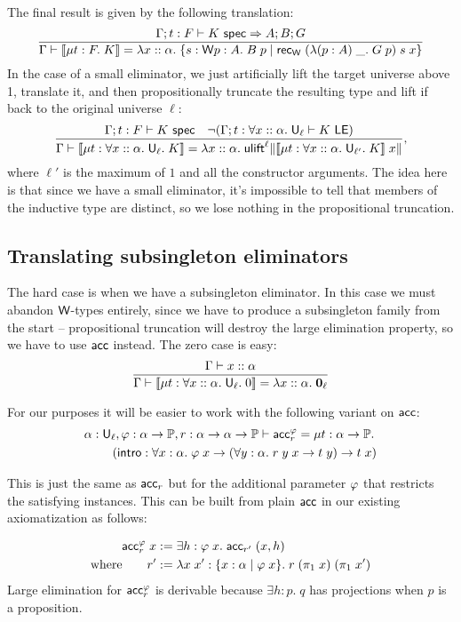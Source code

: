 The final result is given by the following translation:
$$\frac{\Gamma;t:F\vdash K\spec\Rightarrow A;B;G}
{\Gamma\vdash\scott{\mu t:F.\;K}=\lambda x::\alpha.\;\{s:\W p:A.\;B\;p\mid \rec_\W\;(\lambda (p:A)\; \_.\;G\;p)\;s\;x\}}$$
In the case of a small eliminator, we just artificially lift the target universe above 1, translate it, and then propositionally truncate the resulting type and lift if back to the original universe $\ell$:
$$\frac{\Gamma;t:F\vdash K\spec\quad \neg(\Gamma;t:\forall x::\alpha.\;\U_\ell\vdash K\LE)}
{\Gamma\vdash\scott{\mu t:\forall x::\alpha.\;\U_\ell.\;K}=\lambda x::\alpha.\;\ulift^\ell\|\scott{\mu t:\forall x::\alpha.\;\U_{\ell'}.\;K}\;x\|},$$
where $\ell'$ is the maximum of $1$ and all the constructor arguments. The idea here is that since we have a small eliminator, it's impossible to tell that members of the inductive type are distinct, so we lose nothing in the propositional truncation.

\subsection{Translating subsingleton eliminators}
The hard case is when we have a subsingleton eliminator. In this case we must abandon $\mathsf{W}$-types entirely, since we have to produce a subsingleton family from the start -- propositional truncation will destroy the large elimination property, so we have to use $\mathsf{acc}$ instead. The zero case is easy:
$$\frac{\Gamma\vdash x::\alpha}
{\Gamma\vdash\scott{\mu t:\forall x::\alpha.\;\U_\ell.\;0}=\lambda x::\alpha.\;{\bf 0}_\ell}$$

For our purposes it will be easier to work with the following variant on $\mathsf{acc}$:
\begin{align*}
&\alpha:\mathsf{U}_\ell,\varphi:\alpha\to\mathbb{P},r:\alpha\to\alpha\to\mathbb{P}\vdash\mathsf{acc}^\varphi_r=\mu t:\alpha\to\mathbb{P}.\\
&\qquad\;(\mathsf{intro}:\forall x:\alpha.\;\varphi\;x\to(\forall y:\alpha.\;r\;y\;x\to t\;y)\to t\;x)
\end{align*}

This is just the same as $\mathsf{acc}_r$ but for the additional parameter $\varphi$ that restricts the satisfying instances. This can be built from plain $\mathsf{acc}$ in our existing axiomatization as follows:

\begin{align*}
\mathsf{acc}^\varphi_r\;x&:=\exists h:\varphi\;x.\;\mathsf{acc}_{r'}\;(x,h)\\
\mbox{where}\qquad r'&:=\lambda x\;x':\{x:\alpha\mid \varphi\;x\}.\;r\;(\pi_1\;x)\;(\pi_1\;x')
\end{align*}
Large elimination for $\mathsf{acc}^\varphi_r$ is derivable because $\exists h:p.\;q$ has projections when $p$ is a proposition.

